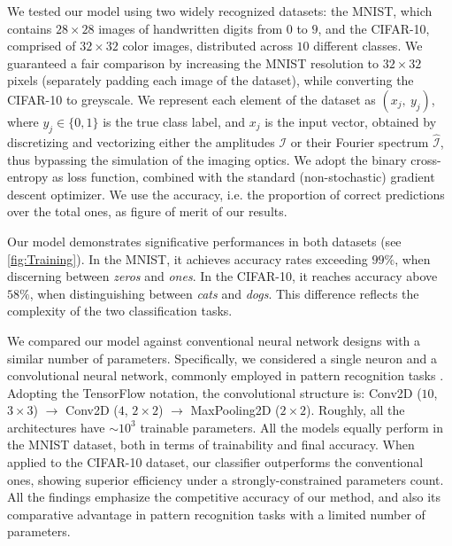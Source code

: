 \documentclass[reprint,
superscriptaddress,
nofootinbib,
aps,
pra,
showkeys
]{revtex4-2}
\newcommand{\I}{\mathcal{I}}
\begin{document}
We tested our model using two widely recognized datasets: the MNIST, which contains $28 \times 28$ images of handwritten digits from $0$ to $9$, and the CIFAR-10, comprised of $32 \times 32$ color images, distributed across $10$ different classes. We guaranteed a fair comparison by increasing the MNIST resolution to $32 \times 32$ pixels (separately padding each image of the dataset), while converting the CIFAR-10 to greyscale. We represent each element of the dataset as $(x_j, \ y_j)$, where $y_j \in \{0, 1\}$ is the true class label, and $x_j$ is the input vector, obtained by discretizing and vectorizing either the amplitudes $\I$ or their Fourier spectrum $\hat{\I}$, thus bypassing the simulation of the imaging optics. We adopt the binary cross-entropy as loss function, combined with the standard (non-stochastic) gradient descent optimizer. We use the accuracy, i.e. the proportion of correct predictions over the total ones, as figure of merit of our results.

Our model demonstrates significative performances in both datasets (see \cref{fig:Training}). In the MNIST, it achieves accuracy rates exceeding $99\%$, when discerning between \emph{zeros} and \emph{ones}. In the CIFAR-10, it reaches accuracy above $58\%$, when distinguishing between \emph{cats} and \emph{dogs}. This difference reflects the complexity of the two classification tasks.

We compared our model against conventional neural network designs with a similar number of parameters. Specifically, we considered a single neuron and a convolutional neural network, commonly employed in pattern recognition tasks \citep{art:Bengio, art:Rosenblatt, art:AlexNet}. Adopting the TensorFlow notation, the convolutional structure is: Conv2D ($10$, $3 \times 3$) $\to$ Conv2D ($4$, $2 \times 2$) $\to$ MaxPooling2D ($2 \times 2$). Roughly, all the architectures have $\sim 10^3$ trainable parameters. All the models equally perform in the MNIST dataset, both in terms of trainability and final accuracy. When applied to the CIFAR-10 dataset, our classifier outperforms the conventional ones, showing superior efficiency under a strongly-constrained parameters count. All the findings emphasize the competitive accuracy of our method, and also its comparative advantage in pattern recognition tasks with a limited number of parameters.
\end{document}
